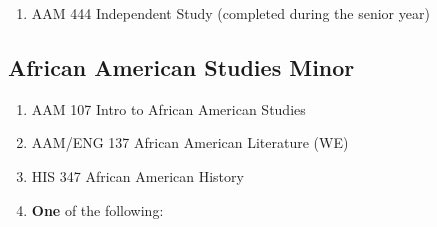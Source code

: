 \documentclass[
  letterpaper,
]{scrbook}
\providecommand{\tightlist}{%
  \setlength{\itemsep}{0pt}\setlength{\parskip}{0pt}}
\begin{document}
\begin{enumerate}
\begin{itemize}
    \begin{itemize}
    \tightlist
    \item
      ARH 297 Topics in Art History: US Pluralism
    \item
      COM 157 Introduction to Media Analysis
    \item
      COM 161 Visual Rhetoric
    \item
      COM 377 Language, Power, and Social Change
    \item
      ENG 107 Exploring Literature:US Pluralism
    \item
      ENG 207 Gender \& Literature: US Pluralism
    \item
      ENG 347 Modern/Contemp. American Literature
    \item
      ENG 394 Directed Learning in English
    \item
      HIS 297 Women in America
    \item
      HIS 444 Independent Study
    \item
      HIS 472 Seminar American History I
    \item
      HIS 473 Seminar American History II
    \item
      SOC 237 Topics in Sociology:U S Pluralism
    \item
      SOC 464 Sociology Capstone
    \item
      THE 488 Special Topics in THE/ FLM:DWP
    \end{itemize}
  \end{itemize}
\item
  AAM 444 Independent Study (completed during the senior year)
\end{enumerate}

\subsection{African American Studies
Minor}\label{african-american-studies-minor}

\begin{enumerate}
\def\labelenumi{\arabic{enumi}.}
\tightlist
\item
  AAM 107 Intro to African American Studies\\
\item
  AAM/ENG 137 African American Literature (WE)
\item
  HIS 347 African American History\\
\item
  \textbf{One} of the following:
\end{enumerate}
\end{document}
